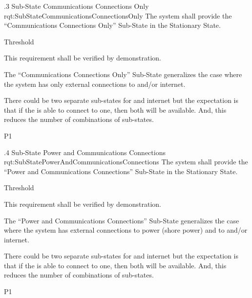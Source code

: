 \ONERQMTVKSA
{\RqtNumberBase.3}
{Sub-State Communications Connections Only}
{rqt:SubStateCommunicationsConnectionsOnly}
{The system shall provide the ``Communications Connections Only'' Sub-State in the Stationary State.}
{
	\item [Phase 1] Threshold
}
{This requirement shall be verified by demonstration.}
%
{
	\item The ``Communications Connections Only'' Sub-State generalizes the case where the system has only external connections to \POTS and/or internet.
	\item There could be two separate sub-states for \POTS and internet but the expectation is that if the \ThisSys is able to connect to one, then both will be available. And, this reduces the number of combinations of sub-states.
}
{P1}


\ONERQMTVKSA
{\RqtNumberBase.4}
{Sub-State Power and Communications Connections}
{rqt:SubStatePowerAndCommunicationsConnections}
{The system shall provide the ``Power and Communications Connections'' Sub-State in the Stationary State.}
{
	\item [Phase 1] Threshold
}
{This requirement shall be verified by demonstration.}

{
	\item The ``Power and Communications Connections'' Sub-State generalizes the case where the system has external connections to power (shore power) and to \POTS and/or internet.
	\item There could be two separate sub-states for \POTS and internet but the expectation is that if the \ThisSys is able to connect to one, then both will be available. And, this reduces the number of combinations of sub-states.
}
{P1}
